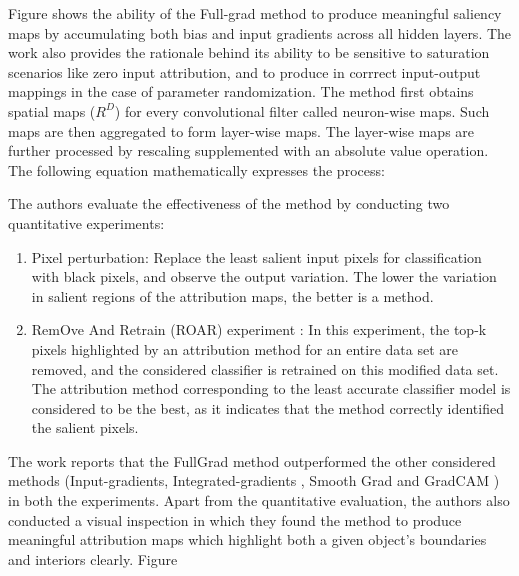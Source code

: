 \documentclass[../report.tex]{subfiles}
\begin{document}
Figure shows the ability of the Full-grad method to produce meaningful saliency maps by accumulating both bias and input gradients across all hidden layers. The work also provides the rationale behind its ability to be sensitive to saturation scenarios like zero input attribution, and to produce in corrrect input-output mappings in the case of parameter randomization. The method first obtains spatial maps ($R^D$)  for every convolutional filter called neuron-wise maps. Such maps are then aggregated to form layer-wise maps. The layer-wise maps are further processed by rescaling supplemented with an absolute value operation. The following equation mathematically expresses the process: 


The authors evaluate the effectiveness of the method by conducting two quantitative experiments:
\begin{enumerate}
	\item Pixel perturbation: Replace the least salient input pixels for classification with black pixels, and observe the output variation. The lower the variation in salient regions of the attribution maps, the better is a method.
	\item  RemOve And Retrain (ROAR) experiment \cite{hooker2018evaluating}: In this experiment, the top-k pixels highlighted by an attribution method for an entire data set are removed, and the considered classifier is retrained on this modified data set. The attribution method corresponding to the least accurate classifier model is considered to be the best, as it indicates that the method correctly identified the salient pixels.
\end{enumerate}
The work reports that the FullGrad method outperformed the other considered methods (Input-gradients\cite{shrikumar2017learning}, Integrated-gradients \cite{sundararajan2017axiomatic}, Smooth Grad \cite{smilkov2017smoothgrad} and GradCAM \cite{selvaraju2017grad}) in both the experiments. Apart from the quantitative evaluation, the authors also conducted a visual inspection in which they found the method to produce meaningful attribution maps which highlight both a given object’s boundaries and interiors clearly. Figure
\end{document}
